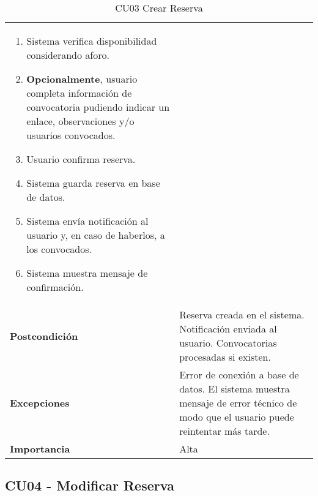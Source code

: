 \begin{table}[H]
\begin{tabularx}{\linewidth}{ p{} p{} }
\begin{enumerate}
\begin{itemize}
  		\end{itemize}
            \item Sistema verifica disponibilidad considerando aforo.
            \item \textbf{Opcionalmente}, usuario completa información de convocatoria pudiendo indicar un enlace, observaciones y/o usuarios convocados.
            \item Usuario confirma reserva.
            \item Sistema guarda reserva en base de datos.
            \item Sistema envía notificación al usuario y, en caso de haberlos, a los convocados.
            \item Sistema muestra mensaje de confirmación.
		\end{enumerate}\\
		\textbf{Postcondición}        & Reserva creada en el sistema. Notificación enviada al usuario. Convocatorias procesadas si existen.\\
		\textbf{Excepciones}          & Error de conexión a base de datos. El sistema muestra mensaje de error técnico de modo que el usuario puede reintentar más tarde.\\
		\textbf{Importancia}          & Alta \\
		\bottomrule
	\end{tabularx}
	\caption{CU03 Crear Reserva}
	\label{cu:crear-reserva}
\end{table}

\subsection{CU04 - Modificar Reserva}

